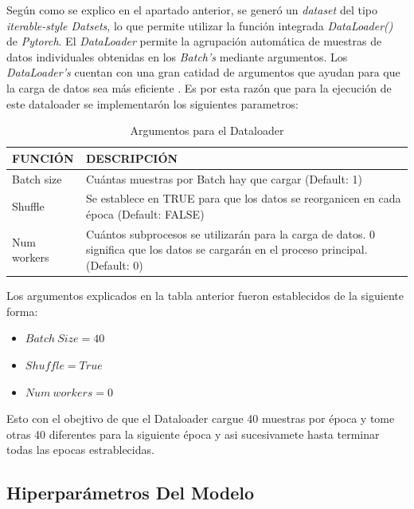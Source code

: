 			Según como se explico en el apartado anterior, se generó un \textit{dataset} del tipo \textit{iterable-style Datsets}, lo que permite utilizar la función integrada \textit{DataLoader()} de \textit{Pytorch}. El \textit{DataLoader} permite la agrupación automática de muestras de datos individuales obtenidas en los \textit{Batch's} mediante argumentos. Los \textit{DataLoader's} cuentan con una gran catidad de argumentos que ayudan para que la carga de datos sea más eficiente \cite{Pytorch}. Es por esta razón que para la ejecución de este dataloader se implementarón los siguientes parametros:
			
			\begin{table}[ht]
				\centering
				\begin{tabular}{|p{3cm}|p{8cm}|}
					\hline
					FUNCIÓN & DESCRIPCIÓN \\ 
					\hline
					Batch size & Cuántas muestras por Batch hay que cargar (Default: 1)\\
					\hline
					Shuffle & Se establece en TRUE para que los datos se reorganicen en cada época (Default: FALSE)  \\
					\hline
					Num workers & Cuántos subprocesos se utilizarán para la carga de datos. 0 significa que los datos se cargarán en el proceso principal. (Default: 0)\\
					\hline
				\end{tabular}	
				\caption{Argumentos para el Dataloader}
				\label{table:Argumentos}
			\end{table}
		
		Los argumentos explicados en la tabla anterior fueron establecidos de la siguiente forma:
		
		\begin{itemize}
			\item $Batch \ Size = 40$
			\item $Shuffle = True$
			\item $Num \ workers = 0$
		\end{itemize}

		Esto con el obejtivo de que el Dataloader cargue 40 muestras por época y tome otras 40 diferentes para la siguiente época y asi sucesivamete hasta terminar todas las epocas estrablecidas.  
		
		
		
			
		
		\subsection{Hiperparámetros Del Modelo}
